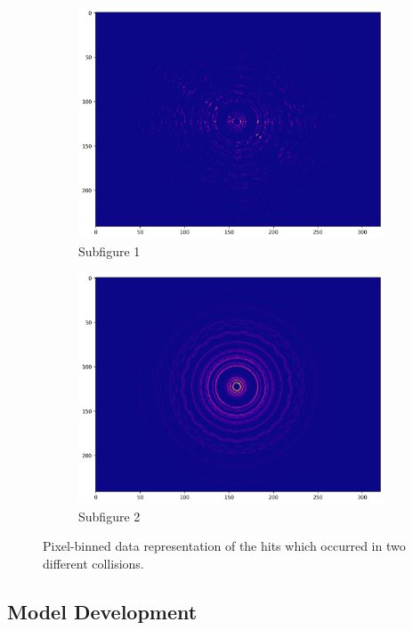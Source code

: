 \begin{figure}[H]
  \centering
  \begin{subfigure}{.48\textwidth}
    \centering
    \includegraphics[width=\linewidth]{resources/images/experiment_cms_tracking_1}
    \caption{Subfigure 1}
    \label{fig:experiment_cms_input_1}
  \end{subfigure}
  \begin{subfigure}{.48\textwidth}
    \centering
    \includegraphics[width=\linewidth]{resources/images/experiment_cms_tracking_2}
    \caption{Subfigure 2}
    \label{fig:experiment_cms_input_2}
  \end{subfigure}
  \caption{Pixel-binned data representation of the hits which occurred in two different collisions.}
  \label{fig:experiment_cms_tracking}
\end{figure}

\subsection{Model Development}
\label{sec:experiment_cms_model_development}

